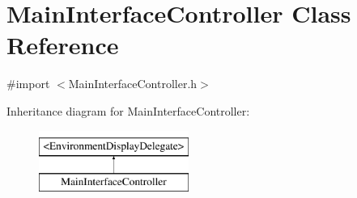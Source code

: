 \hypertarget{interface_main_interface_controller}{
\section{\-Main\-Interface\-Controller \-Class \-Reference}
\label{interface_main_interface_controller}
}


{\ttfamily \#import $<$\-Main\-Interface\-Controller.\-h$>$}

\-Inheritance diagram for \-Main\-Interface\-Controller\-:\begin{figure}[H]
\begin{center}
\leavevmode
\includegraphics[height=2.000000cm]{interface_main_interface_controller}
\end{center}
\end{figure}
